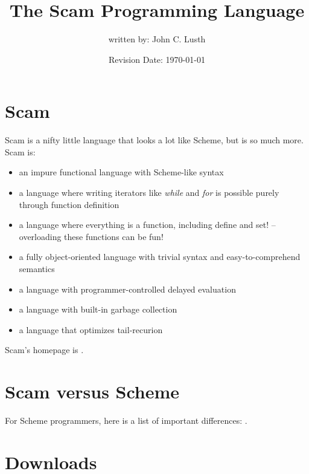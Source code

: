 \documentclass{article}
\title{The Scam Programming Language}
\author{written by: John C. Lusth}
\date{Revision Date: \today}
\begin{document}
\maketitle

\W\htmlrule

\W\subsubsection{}

\section{Scam}

Scam is a nifty little language
that looks a lot like Scheme, but is so much more.
Scam is:

\begin{itemize}
    \item
        an impure functional language with Scheme-like syntax
    \item
        a language where writing iterators like {\it while} and {\it for}
        is possible purely through function definition
    \item
        a language where everything is a function, including define and set!
        -- overloading these functions can be fun!
    \item
        a fully object-oriented language with trivial syntax and
        easy-to-comprehend semantics
    \item
        a language with programmer-controlled delayed
        evaluation
    \item
        a language with built-in garbage collection
    \item
        a language that optimizes tail-recurion
\end{itemize}

Scam's homepage is 
.

\section*{Scam versus Scheme}

For Scheme programmers, here is a list of important
differences: .

\section*{Downloads}
\end{document}
